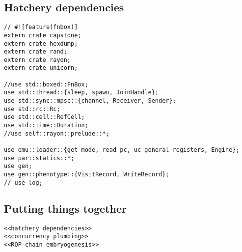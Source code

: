 \documentclass[11pt]{article}
\begin{document}
\subsection{Hatchery dependencies}
\label{sec:org8b7a87c}
\lstset{language=rust,label=orgdf2599f,caption= ,captionpos=b,numbers=none}
\begin{lstlisting}
// #![feature(fnbox)]
extern crate capstone;
extern crate hexdump;
extern crate rand;
extern crate rayon;
extern crate unicorn;

//use std::boxed::FnBox;
use std::thread::{sleep, spawn, JoinHandle};
use std::sync::mpsc::{channel, Receiver, Sender};
use std::rc::Rc;
use std::cell::RefCell;
use std::time::Duration;
//use self::rayon::prelude::*;

use emu::loader::{get_mode, read_pc, uc_general_registers, Engine};
use par::statics::*;
use gen;
use gen::phenotype::{VisitRecord, WriteRecord};
// use log;
\end{lstlisting}


\subsection{Putting things together}
\label{sec:org5250685}
\lstset{language=rust,label=org443e1b5,caption= ,captionpos=b,numbers=none}
\begin{lstlisting}
<<hatchery dependencies>>
<<concurrency plumbing>>
<<ROP-chain embryogenesis>>
\end{lstlisting}
\end{document}
